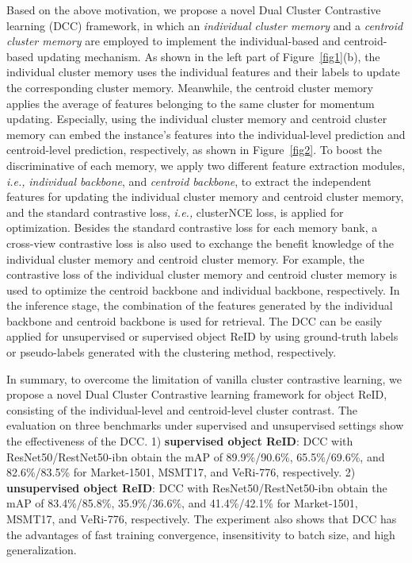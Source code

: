 \documentclass[10pt,twocolumn,letterpaper]{article}
\begin{document}
Based on the above motivation, we propose a novel Dual Cluster Contrastive learning (DCC) framework, in which an \emph{individual cluster memory} and a \emph{centroid cluster memory} are employed to implement the individual-based and centroid-based updating mechanism.
As shown in the left part of Figure~\ref{fig1}(b), the individual cluster memory uses the individual features and their labels to update the corresponding cluster memory.
Meanwhile, the centroid cluster memory applies the average of features belonging to the same cluster for momentum updating.
Especially, using the individual cluster memory and centroid cluster memory can embed the instance's features into the individual-level prediction and centroid-level prediction, respectively, as shown in Figure~\ref{fig2}.
To boost the discriminative of each memory, we apply two different feature extraction modules, \emph{i.e.,} \emph{individual backbone}, and \emph{centroid backbone}, to extract the independent features for updating the individual cluster memory and centroid cluster memory, and the standard contrastive loss, \emph{i.e., }clusterNCE loss,  is applied for optimization.
Besides the standard contrastive loss for each memory bank, a cross-view contrastive loss is also used to exchange the benefit knowledge of the individual cluster memory and centroid cluster memory.
For example, the contrastive loss of the individual cluster memory and centroid cluster memory is used to optimize the centroid backbone and individual backbone, respectively.
In the inference stage, the combination of the features generated by the individual backbone and centroid backbone is used for retrieval.
The DCC can be easily applied for unsupervised or supervised object ReID by using ground-truth labels or pseudo-labels generated with the clustering method, respectively.

In summary, to overcome the limitation of vanilla cluster contrastive learning, we propose a novel Dual Cluster Contrastive learning framework for object ReID, consisting of the individual-level and centroid-level cluster contrast. 
The evaluation on three benchmarks under supervised and unsupervised settings show the effectiveness of the DCC. 1) \textbf{supervised object ReID}: DCC         with ResNet50/RestNet50-ibn obtain the mAP of 89.9\%/90.6\%, 65.5\%/69.6\%, and 82.6\%/83.5\% for Market-1501, MSMT17, and VeRi-776, respectively. 2) \textbf{unsupervised object ReID}: DCC with ResNet50/RestNet50-ibn obtain the mAP of 83.4\%/85.8\%,  35.9\%/36.6\%, and 41.4\%/42.1\% for Market-1501, MSMT17, and VeRi-776, respectively. 
The experiment also shows that DCC has the advantages of fast training convergence, insensitivity to batch size, and high generalization. 
\end{document}
